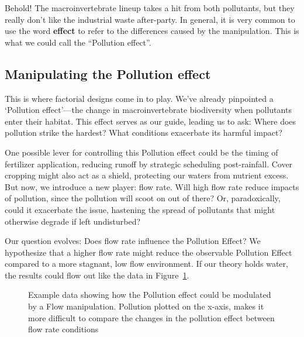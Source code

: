\documentclass[
  letterpaper,
  DIV=11,
  numbers=noendperiod]{scrreprt}
\begin{document}
Behold! The macroinvertebrate lineup takes a hit from both pollutants,
but they really don't like the industrial waste after-party. In general,
it is very common to use the word \textbf{effect} to refer to the
differences caused by the manipulation. This is what we could call the
``Pollution effect''.

\subsection{Manipulating the Pollution
effect}\label{manipulating-the-pollution-effect}

This is where factorial designs come in to play. We've already
pinpointed a `Pollution effect'---the change in macroinvertebrate
biodiversity when pollutants enter their habitat. This effect serves as
our guide, leading us to ask: Where does pollution strike the hardest?
What conditions exacerbate its harmful impact?

One possible lever for controlling this Pollution effect could be the
timing of fertilizer application, reducing runoff by strategic
scheduling post-rainfall. Cover cropping might also act as a shield,
protecting our waters from nutrient excess. But now, we introduce a new
player: flow rate. Will high flow rate reduce impacts of pollution,
since the pollution will scoot on out of there? Or, paradoxically, could
it exacerbate the issue, hastening the spread of pollutants that might
otherwise degrade if left undisturbed?

Our question evolves: Does flow rate influence the Pollution Effect? We
hypothesize that a higher flow rate might reduce the observable
Pollution Effect compared to a more stagnant, low flow environment. If
our theory holds water, the results could flow out like the data in
Figure~\ref{fig-10flow}.

\begin{figure}


\caption{\label{fig-10flow}Example data showing how the Pollution effect
could be modulated by a Flow manipulation. Pollution plotted on the
x-axis, makes it more difficult to compare the changes in the pollution
effect between flow rate conditions}

\end{figure}%
\end{document}
